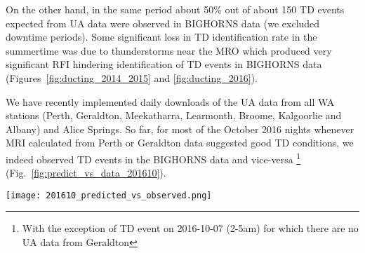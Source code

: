 \documentclass{article}
\begin{document}
On the other hand, in the same period about 50\% out of about 150 TD events expected from UA data were observed in BIGHORNS data (we excluded downtime periods). 
Some significant loss in TD identification rate in the summertime was due to thunderstorms near the MRO which produced very significant RFI hindering identification of TD events in BIGHORNS data (Figures~\ref{fig:ducting_2014_2015} and \ref{fig:ducting_2016}).

We have recently implemented daily downloads of the UA data from all WA stations (Perth, Geraldton, Meekatharra, Learmonth, Broome, Kalgoorlie and Albany) and Alice Springs.
So far, for most of the October 2016 nights whenever MRI calculated from Perth or Geraldton data suggested good TD conditions, we indeed observed TD events in the BIGHORNS data and vice-versa \footnote{With the exception of TD event on 2016-10-07 (2-5am) for which there are no UA data from Geraldton} (Fig.~\ref{fig:predict_vs_data_201610}).


\begin{figure*}[t]
\centering
\texttt{[image: 201610\_predicted\_vs\_observed.png]}
\caption{Maximum and minimum height derivative of MRI calculated from October 2016 UA data from all stations in WA and Alice Springs. If minimum value of the derivative was below -0.079 M/m at altitude below 1000\,m we considered TD to be expected at a given location. The predicted TD events are marked by an open black circle surrounding the colour data point. Magenta rectangles at arbitrary chosen value -1.5 show TD events observed with BIGHORNS system. All BIGHORNS TD events correlated well with expected TD events calculated from the UA data from Geraldton, except TD event observed on 2016-10-07 at 2-5:30 am AWST when no UA data were collected by the Geraldton station on 7,8 and 9th of October 2016. The TD event observed by BIGHORNS during the night 2016-10-18/19 does not have a corresponding TD prediction from Gerladton station due to limited time coverage of UA measurements in Geraldton (and other remote stations), but the UA data from the Perth station indicates good TD conditions. It can also be noted that TD is much more common at warm coastline locations (Learmonth and Broome).}
\label{fig:predict_vs_data_201610}
\end{figure*}
\end{document}
